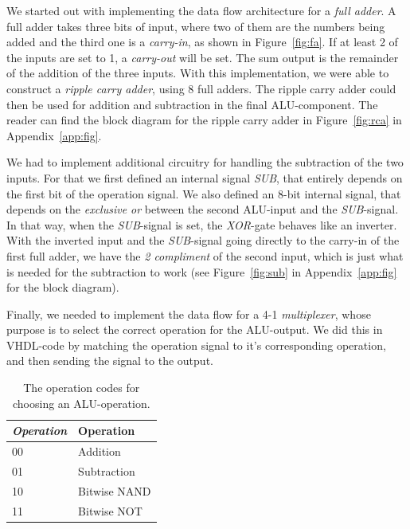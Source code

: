 \documentclass[a4,11pt]{article}
\begin{document}
We started out with implementing the data flow architecture for a {\it full adder}. A full adder
takes three bits of input, where two of them are the numbers being added and the third one is a
{\it carry-in}, as shown in Figure~\ref{fig:fa}. If at least 2 of the inputs are set to 1, a
{\it carry-out} will be set. The sum output is the remainder of the addition of the three inputs.
With this implementation, we were able to construct a {\it ripple carry adder}, using 8 full adders.
The ripple carry adder could then be used for addition and subtraction in the final ALU-component.
The reader can find the block diagram for the ripple carry adder in Figure~\ref{fig:rca} in
Appendix~\ref{app:fig}.

We had to implement additional circuitry for handling the subtraction of the two inputs. For
that we first defined an internal signal {\it SUB}, that entirely depends on the first bit of the
operation signal. We also defined an 8-bit internal signal, that depends on the {\it exclusive
or} between the second ALU-input and the {\it SUB}-signal. In that way, when the {\it SUB}-signal
is set, the {\it XOR}-gate behaves like an inverter. With the inverted input and the {\it SUB}-signal
going directly to the carry-in of the first full adder, we have the {\it 2 compliment} of the second
input, which is just what is needed for the subtraction to work (see Figure~\ref{fig:sub} in
Appendix~\ref{app:fig} for the block diagram).

Finally, we needed to implement the data flow for a 4-1 {\it multiplexer}, whose purpose is to
select the correct operation for the ALU-output. We did this in VHDL-code by matching the operation
signal to it's corresponding operation, and then sending the signal to the output.

\begin{table}   
	\centering
	\small
	\def\arraystretch{1.1}              
	\begin{tabular}{|l|l|}
		\hline
		{\it Operation} & {\bf Operation} \\ \hline
		00              & Addition        \\ 
		01              & Subtraction     \\
		10              & Bitwise NAND    \\ 
		11              & Bitwise NOT     \\ \hline
	\end{tabular}
	\caption{The operation codes for choosing an ALU-operation.}
	\label{tab:op}
\end{table}
\end{document}
